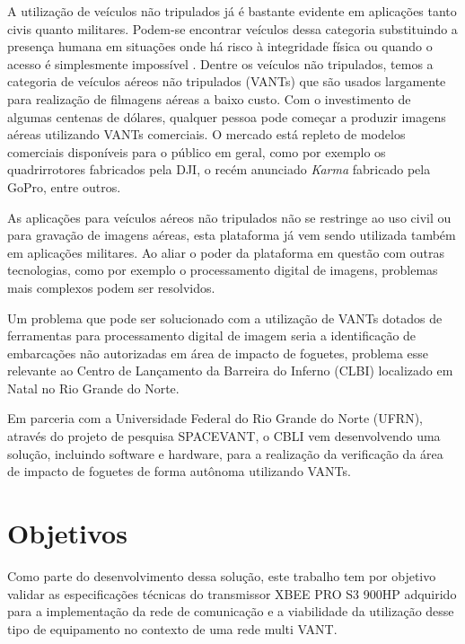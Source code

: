 \label{Cap:introducao}

A utilização de veículos não tripulados já é bastante evidente em aplicações tanto civis quanto militares. Podem-se encontrar veículos dessa categoria substituindo a presença humana em situações onde há risco à integridade física ou quando o acesso é simplesmente impossível \cite{UAVSurveypt1}. Dentre os veículos não tripulados, temos a categoria de veículos aéreos não tripulados (VANTs) que são usados largamente para realização de filmagens aéreas a baixo custo. Com o investimento de algumas centenas de dólares, qualquer pessoa pode começar a produzir imagens aéreas utilizando VANTs comerciais. O mercado está repleto de modelos comerciais disponíveis para o público em geral, como por exemplo os quadrirrotores fabricados pela DJI\textsuperscript{\texttrademark}, o recém anunciado \emph{Karma} fabricado pela GoPro\textsuperscript{\texttrademark}, entre outros.

As aplicações para veículos aéreos não tripulados não se restringe ao uso civil ou para gravação de imagens aéreas, esta plataforma já vem sendo utilizada também em aplicações militares. Ao aliar o poder da plataforma em questão com outras tecnologias, como por exemplo o processamento digital de imagens, problemas mais complexos podem ser resolvidos. 

Um problema que pode ser solucionado com a utilização de VANTs dotados de ferramentas para processamento digital de imagem seria a identificação de embarcações não autorizadas em área de impacto de foguetes, problema esse relevante ao Centro de Lançamento da Barreira do Inferno (CLBI) localizado em Natal no Rio Grande do Norte. 

Em parceria com a Universidade Federal do Rio Grande do Norte (UFRN), através do projeto de pesquisa SPACEVANT, o CBLI vem desenvolvendo uma solução, incluindo software e hardware, para a realização da verificação da área de impacto de foguetes de forma autônoma utilizando VANTs. 

\section{Objetivos}

Como parte do desenvolvimento dessa solução, este trabalho tem por objetivo validar as especificações técnicas do transmissor XBEE PRO S3 900HP adquirido para a implementação da rede de comunicação e a viabilidade da utilização desse tipo de equipamento no contexto de uma rede multi VANT.

